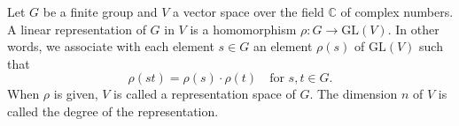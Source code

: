 Let $G$ be a finite group and $V$ a vector space over the field $\mathbb{C}$ of complex numbers.
A linear representation of $G$ in $V$ is a homomorphism $\rho: G \to \mathrm{GL}(V)$.
In other words, we associate with each element $s \in G$ an element $\rho(s)$ of $\mathrm{GL}(V)$ such that
$$\rho(st) = \rho(s) \cdot \rho(t) \quad \text{for } s, t \in G.$$
When $\rho$ is given, $V$ is called a representation space of $G$.
The dimension $n$ of $V$ is called the degree of the representation.
